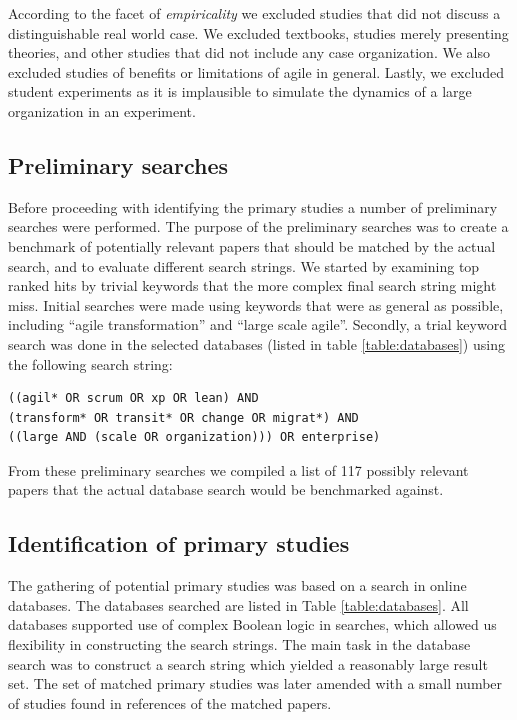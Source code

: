 
According to the facet of \emph{empiricality} we excluded studies that did not
discuss a distinguishable real world case. We excluded textbooks, studies merely
presenting theories, and other studies that did not include any case
organization. We also excluded studies of benefits or limitations of agile in
general. Lastly, we excluded student experiments as it is implausible to
simulate the dynamics of a large organization in an experiment.


\subsection{Preliminary searches}

Before proceeding with identifying the primary studies a number of preliminary
searches were performed. The purpose of the preliminary searches was to create a
benchmark of potentially relevant papers that should be matched by the actual
search, and to evaluate different search strings. We started by examining top
ranked hits by trivial keywords that the more complex final search string might
miss. Initial searches were made using keywords that were as general as
possible, including ``agile transformation'' and ``large scale agile''.
Secondly, a trial keyword search was done in the selected databases (listed in
table \ref{table:databases}) using the following search string:

\begin{verbatim}
((agil* OR scrum OR xp OR lean) AND
(transform* OR transit* OR change OR migrat*) AND
((large AND (scale OR organization))) OR enterprise)
\end{verbatim}

From these preliminary searches we compiled a list of 117 possibly relevant
papers that the actual database search would be benchmarked against.


\subsection{Identification of primary studies}

The gathering of potential primary studies was based on a search in online
databases. The databases searched are listed in Table \ref{table:databases}. All
databases supported use of complex Boolean logic in searches, which allowed us
flexibility in constructing the search strings. The main task in the database
search was to construct a search string which yielded a reasonably large result
set. The set of matched primary studies was later amended with a small number
of studies found in references of the matched papers.

